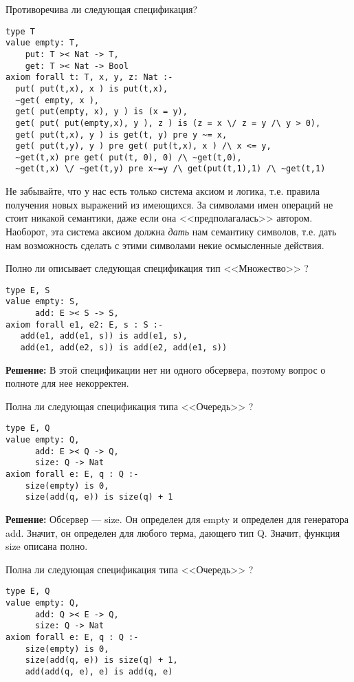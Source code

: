\z Противоречива ли следующая спецификация?
\begin{lstlisting}
type T
value empty: T,
    put: T >< Nat -> T,
    get: T >< Nat -> Bool
axiom forall t: T, x, y, z: Nat :-
  put( put(t,x), x ) is put(t,x),
  ~get( empty, x ),
  get( put(empty, x), y ) is (x = y),
  get( put( put(empty,x), y ), z ) is (z = x \/ z = y /\ y > 0),
  get( put(t,x), y ) is get(t, y) pre y ~= x,
  get( put(t,y), y ) pre get( put(t,x), x ) /\ x <= y,
  ~get(t,x) pre get( put(t, 0), 0) /\ ~get(t,0),
  ~get(t,x) \/ ~get(t,y) pre x~=y /\ get(put(t,1),1) /\ ~get(t,1)
\end{lstlisting}


Не забывайте, что у нас есть только система аксиом и логика, т.е. правила получения новых выражений из имеющихся. За символами имен операций не стоит никакой семантики, даже если она <<предполагалась>> автором. Наоборот, эта система аксиом должна \emph{дать} нам семантику символов, т.е. дать нам возможность сделать с этими символами некие осмысленные действия.

\z Полно ли описывает следующая спецификация тип <<Множество>> ?
\begin{lstlisting}
type E, S
value empty: S,
      add: E >< S -> S,
axiom forall e1, e2: E, s : S :-
   add(e1, add(e1, s)) is add(e1, s),
   add(e1, add(e2, s)) is add(e2, add(e1, s))
\end{lstlisting}

\textbf{Решение:}
В этой спецификации нет ни одного обсервера, поэтому вопрос о полноте для нее некорректен.

\z Полна ли следующая спецификация типа <<Очередь>> ?
\begin{lstlisting}
type E, Q
value empty: Q,
      add: E >< Q -> Q,
      size: Q -> Nat
axiom forall e: E, q : Q :-
    size(empty) is 0,
    size(add(q, e)) is size(q) + 1
\end{lstlisting}

\textbf{Решение:}
Обсервер --- size. Он определен для empty и определен для генератора add. Значит, он определен для любого терма, дающего тип Q. Значит, функция size описана полно.

\z Полна ли следующая спецификация типа <<Очередь>> ?
\begin{lstlisting}
type E, Q
value empty: Q,
      add: Q >< E -> Q,
      size: Q -> Nat
axiom forall e: E, q : Q :-
    size(empty) is 0,
    size(add(q, e)) is size(q) + 1,
    add(add(q, e), e) is add(q, e)
\end{lstlisting}

